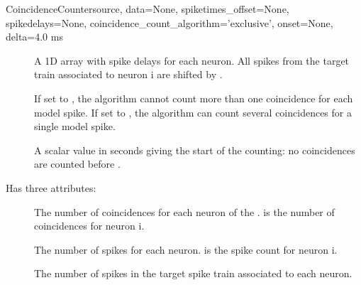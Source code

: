 \documentclass[letterpaper,10pt,english]{manual}
\begin{document}
\begin{classdesc}{CoincidenceCounter}{source, data=None, spiketimes\_offset=None, spikedelays=None, coincidence\_count\_algorithm='exclusive', onset=None, delta=4.0 ms}
\begin{description}
\item[] \leavevmode
A 1D array with spike delays for each neuron. All spikes from the target 
train associated to neuron i are shifted by .

\item[] \leavevmode
If set to , the algorithm cannot count more than one
coincidence for each model spike.
If set to , the algorithm can count several coincidences
for a single model spike.

\item[] \leavevmode
A scalar value in seconds giving the start of the counting: no
coincidences are counted before .

\end{description}

Has three attributes:
\begin{description}
\item[] \leavevmode
The number of coincidences for each neuron of the \hyperlink{brian.NeuronGroup}{}.
 is the number of coincidences for neuron i.

\item[] \leavevmode
The number of spikes for each neuron.  is the spike
count for neuron i.

\item[] \leavevmode
The number of spikes in the target spike train associated to each neuron.

\end{description}
\end{classdesc}
\end{document}
